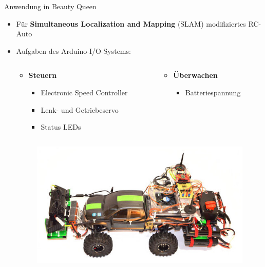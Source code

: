 \documentclass{beamer}
\begin{document}
\begin{frame}{Anwendung in Beauty Queen}
	\begin{itemize}
		\item F\"ur \textbf{Simultaneous Localization and Mapping} (SLAM) modifiziertes RC-Auto
		\item Aufgaben des Arduino-I/O-Systems:
		\begin{columns}
			\begin{column}{0.5\textwidth}
				\begin{itemize}
					\item \textbf{Steuern}
					\begin{itemize}
						\item Electronic Speed Controller
						\item Lenk- und Getriebeservo
						\item Status LEDs
					\end{itemize}
				\end{itemize}
			\end{column}
			\begin{column}{0.5\textwidth}
				\begin{itemize}
					\item \textbf{\"Uberwachen}
					\begin{itemize}
						\item Batteriespannung
					\end{itemize}
				\end{itemize}
			\end{column}
		\end{columns}
		\begin{figure}[htbp]
			\centering
			\includegraphics[scale=0.40]{./images/robot-beauty-queen.jpg}
		\end{figure}
	\end{itemize}
\end{frame}
\end{document}
